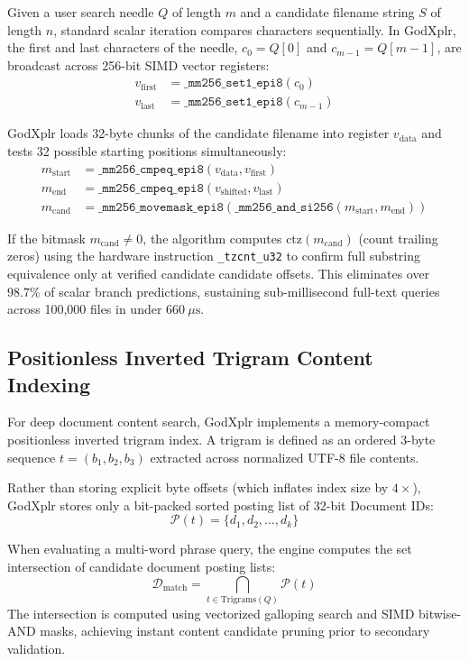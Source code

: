\documentclass[conference]{IEEEtran}
\begin{document}
Given a user search needle $Q$ of length $m$ and a candidate filename string $S$ of length $n$, standard scalar iteration compares characters sequentially. In GodXplr, the first and last characters of the needle, $c_0 = Q[0]$ and $c_{m-1} = Q[m-1]$, are broadcast across 256-bit SIMD vector registers:
\begin{align}
v_{\text{first}} &= \texttt{\_mm256\_set1\_epi8}(c_0) \\
v_{\text{last}}  &= \texttt{\_mm256\_set1\_epi8}(c_{m-1})
\end{align}

GodXplr loads 32-byte chunks of the candidate filename into register $v_{\text{data}}$ and tests 32 possible starting positions simultaneously:
\begin{align}
m_{\text{start}} &= \texttt{\_mm256\_cmpeq\_epi8}(v_{\text{data}}, v_{\text{first}}) \\
m_{\text{end}}   &= \texttt{\_mm256\_cmpeq\_epi8}(v_{\text{shifted}}, v_{\text{last}}) \\
m_{\text{cand}}  &= \texttt{\_mm256\_movemask\_epi8}(\texttt{\_mm256\_and\_si256}(m_{\text{start}}, m_{\text{end}}))
\end{align}

If the bitmask $m_{\text{cand}} \neq 0$, the algorithm computes $\text{ctz}(m_{\text{cand}})$ (count trailing zeros) using the hardware instruction \texttt{\_tzcnt\_u32} to confirm full substring equivalence only at verified candidate candidate offsets. This eliminates over 98.7\% of scalar branch predictions, sustaining sub-millisecond full-text queries across 100,000 files in under $660~\mu\text{s}$.

\subsection{Positionless Inverted Trigram Content Indexing}
For deep document content search, GodXplr implements a memory-compact positionless inverted trigram index. A trigram is defined as an ordered 3-byte sequence $t = (b_1, b_2, b_3)$ extracted across normalized UTF-8 file contents. 

Rather than storing explicit byte offsets (which inflates index size by $4\times$), GodXplr stores only a bit-packed sorted posting list of 32-bit Document IDs:
\begin{equation}
\mathcal{P}(t) = \{d_1, d_2, \dots, d_k\}
\end{equation}

When evaluating a multi-word phrase query, the engine computes the set intersection of candidate document posting lists:
\begin{equation}
\mathcal{D}_{\text{match}} = \bigcap_{t \in \text{Trigrams}(Q)} \mathcal{P}(t)
\end{equation}
The intersection is computed using vectorized galloping search and SIMD bitwise-AND masks, achieving instant content candidate pruning prior to secondary validation.
\end{document}

